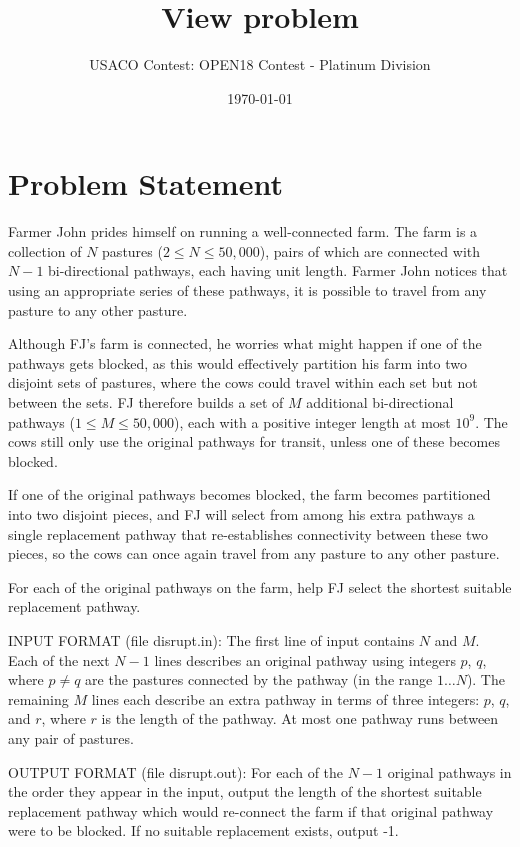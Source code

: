 \documentclass[12pt]{article}
\title{View problem}
\author{USACO Contest: OPEN18 Contest - Platinum Division}
\date{\today}
\begin{document}
\maketitle

\section*{Problem Statement}

Farmer John prides himself on running a well-connected farm.  The farm is a 
collection of $N$ pastures ($2 \leq N \leq 50,000$), pairs of which are 
connected with $N-1$ bi-directional pathways, each having unit length. Farmer
John notices that using an appropriate series of these pathways,  it is possible
to travel from any pasture to any other pasture.

Although FJ's farm is connected, he worries what might happen if one of  the
pathways gets blocked, as this would effectively partition his farm into two
disjoint sets of pastures, where the cows could travel within each set but not
between the sets.  FJ therefore builds a set of $M$ additional  bi-directional
pathways ($1 \leq M \leq 50,000$), each with a positive integer length at most
$10^9$.  The cows still only use the original pathways  for transit, unless one
of these becomes blocked.  

If one of the original pathways becomes blocked, the farm becomes partitioned
into two disjoint pieces, and FJ will select from among his extra pathways a 
single replacement pathway that re-establishes connectivity between these two
pieces, so the cows can once again travel from any pasture to any other pasture.

For each of the original pathways on the farm, help FJ select the shortest
suitable replacement pathway.

INPUT FORMAT (file disrupt.in):
The first line of input contains $N$ and $M$.  Each of the next $N-1$ lines
describes an original pathway using integers $p$, $q$, where $p \neq q$ are the
pastures connected by the pathway (in the range $1 \ldots N$).  The remaining
$M$ lines each describe an extra pathway in terms of three integers: $p$, $q$,
and $r$, where $r$ is the length of the pathway. At most one pathway runs
between any pair of pastures.

OUTPUT FORMAT (file disrupt.out):
For each of the $N-1$ original pathways in the order they appear in the input,
output the length of the shortest suitable replacement pathway which would 
re-connect the farm if that original pathway were to be blocked.  If no suitable
replacement exists, output -1.
\end{document}

